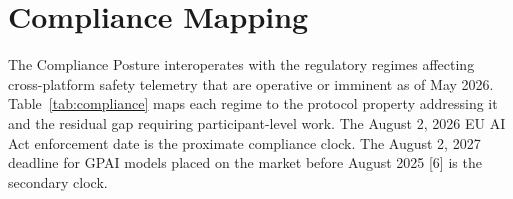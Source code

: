 \documentclass[11pt]{article}
\begin{document}
\section{Compliance Mapping}
\label{sec:compliance}

The Compliance Posture interoperates with the regulatory regimes affecting cross-platform safety telemetry that are operative or imminent as of May 2026. Table~\ref{tab:compliance} maps each regime to the protocol property addressing it and the residual gap requiring participant-level work. The August 2, 2026 EU AI Act enforcement date is the proximate compliance clock. The August 2, 2027 deadline for GPAI models placed on the market before August 2025 [6] is the secondary clock.

\renewcommand{\arraystretch}{1.35}
\end{document}
